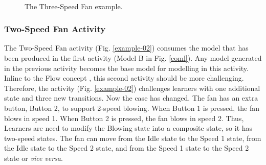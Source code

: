\documentclass[conference]{IEEEtran}
\begin{document}
\begin{figure}[!t]
    \centering
    \\
	\caption{The Three-Speed Fan example.}
    \label{example-03}
\end{figure}

\subsubsection{Two-Speed Fan Activity}
The Two-Speed Fan activity (Fig. \ref{example-02}) consumes the model that has been produced in the first activity (Model B in Fig. \ref{eoml}). Any model generated in the previous activity becomes the base model for modelling in this activity. Inline to the Flow concept \cite{csikszentmihalyi2014toward}, this second activity should be more challenging. Therefore, the activity (Fig. \ref{example-02}) challenges learners with one additional state and three new transitions. Now the case has changed. The fan has an extra button, Button 2, to support 2-speed blowing. When Button 1 is pressed, the fan blows in speed 1. When Button 2 is pressed, the fan blows in speed 2. Thus, Learners are need to modify the Blowing state into a composite state, so it has two-speed states. The fan can move from the Idle state to the Speed 1 state, from the Idle state to the Speed 2 state, and from the Speed 1 state to the Speed 2 state or \textit{vice versa}.
\end{document}
